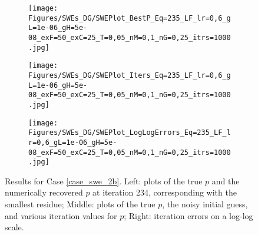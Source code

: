 \begin{figure}[h]
    \begin{subfigure}[t]{0.32\textwidth}
        \centering
        \texttt{[image: Figures/SWEs\_DG/SWEPlot\_BestP\_Eq=235\_LF\_lr=0,6\_gL=1e-06\_gH=5e-08\_exF=50\_exC=25\_T=0,05\_nM=0,1\_nG=0,25\_itrs=1000.jpg]}
    \end{subfigure}
    \begin{subfigure}[t]{0.32\textwidth}
        \centering
        \texttt{[image: Figures/SWEs\_DG/SWEPlot\_Iters\_Eq=235\_LF\_lr=0,6\_gL=1e-06\_gH=5e-08\_exF=50\_exC=25\_T=0,05\_nM=0,1\_nG=0,25\_itrs=1000.jpg]}
    \end{subfigure}
    \begin{subfigure}[t]{0.32\textwidth}
        \texttt{[image: Figures/SWEs\_DG/SWEPlot\_LogLogErrors\_Eq=235\_LF\_lr=0,6\_gL=1e-06\_gH=5e-08\_exF=50\_exC=25\_T=0,05\_nM=0,1\_nG=0,25\_itrs=1000.jpg]}
    \end{subfigure}
    \caption{Results for Case \eqref{case_swe_2b}. 
    Left: plots of the true $p$ and the numerically recovered $p$ at iteration 234, corresponding with the smallest residue; Middle: plots of the true $p$, the noisy initial guess, and various iteration values for $p$;  Right: iteration errors on a log-log scale.
    }
    \label{fig:swe_2B}
\end{figure}

